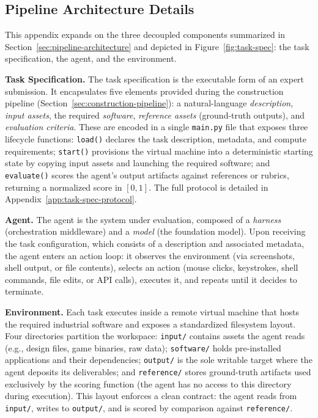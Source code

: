 \subsection{Pipeline Architecture Details}
\label{app:pipeline-architecture}

This appendix expands on the three decoupled components summarized in Section~\ref{sec:pipeline-architecture} and depicted in Figure~\ref{fig:task-spec}: the task specification, the agent, and the environment.

\noindent \textbf{Task Specification.}
The task specification is the executable form of an expert submission. It encapsulates five elements provided during the construction pipeline (Section~\ref{sec:construction-pipeline}): a natural-language \emph{description}, \emph{input assets}, the required \emph{software}, \emph{reference assets} (ground-truth outputs), and \emph{evaluation criteria}. These are encoded in a single \texttt{main.py} file that exposes three lifecycle functions: \texttt{load()} declares the task description, metadata, and compute requirements; \texttt{start()} provisions the virtual machine into a deterministic starting state by copying input assets and launching the required software; and \texttt{evaluate()} scores the agent's output artifacts against references or rubrics, returning a normalized score in $[0, 1]$. The full protocol is detailed in Appendix~\ref{app:task-spec-protocol}.

\noindent \textbf{Agent.}
The agent is the system under evaluation, composed of a \emph{harness} (orchestration middleware) and a \emph{model} (the foundation model). Upon receiving the task configuration, which consists of a description and associated metadata, the agent enters an action loop: it observes the environment (via screenshots, shell output, or file contents), selects an action (mouse clicks, keystrokes, shell commands, file edits, or API calls), executes it, and repeats until it decides to terminate.

\noindent \textbf{Environment.}
Each task executes inside a remote virtual machine that hosts the required industrial software and exposes a standardized filesystem layout. Four directories partition the workspace: \texttt{input/} contains assets the agent reads (e.g., design files, game binaries, raw data); \texttt{software/} holds pre-installed applications and their dependencies; \texttt{output/} is the sole writable target where the agent deposits its deliverables; and \texttt{reference/} stores ground-truth artifacts used exclusively by the scoring function (the agent has no access to this directory during execution). This layout enforces a clean contract: the agent reads from \texttt{input/}, writes to \texttt{output/}, and is scored by comparison against \texttt{reference/}.

